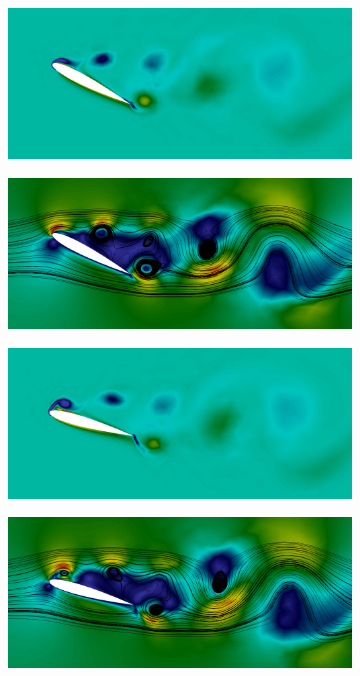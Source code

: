 \begin{figure}[h!]
\begin{subfigure}{.49\linewidth}
        \centering
        \includegraphics[width=\linewidth]{Figuras/rotating-airfoil/vort4.png}
    \end{subfigure}
    \begin{subfigure}{.49\linewidth}
        \centering
        \includegraphics[width=\linewidth]{Figuras/rotating-airfoil/str4.png}
    \end{subfigure}
    \caption*{Instante $t=8,6$.}
    \begin{subfigure}{.49\linewidth}
        \centering
        \includegraphics[width=\linewidth]{Figuras/rotating-airfoil/vort5.png}
    \end{subfigure}
    \begin{subfigure}{.49\linewidth}
        \centering
        \includegraphics[width=\linewidth]{Figuras/rotating-airfoil/str5.png}

\end{subfigure}
\end{figure}
